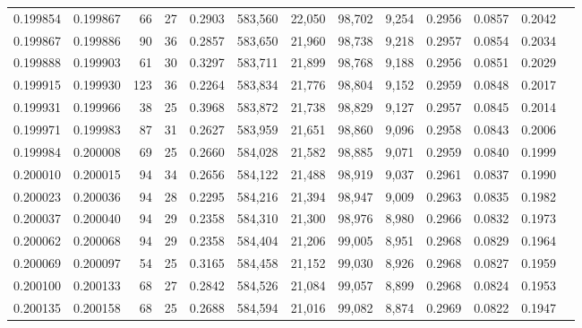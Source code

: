 \begin{tabular}{rrrrrrrrrrrrr}
0.199854 & 0.199867 &    66 &  27 &                                     0.2903 & 583,560 &  22,050 &  98,702 &   9,254 & 0.2956 & 0.0857 & 0.2042 \\
0.199867 & 0.199886 &    90 &  36 &                                     0.2857 & 583,650 &  21,960 &  98,738 &   9,218 & 0.2957 & 0.0854 & 0.2034 \\
0.199888 & 0.199903 &    61 &  30 &                                     0.3297 & 583,711 &  21,899 &  98,768 &   9,188 & 0.2956 & 0.0851 & 0.2029 \\
0.199915 & 0.199930 &   123 &  36 &                                     0.2264 & 583,834 &  21,776 &  98,804 &   9,152 & 0.2959 & 0.0848 & 0.2017 \\
0.199931 & 0.199966 &    38 &  25 &                                     0.3968 & 583,872 &  21,738 &  98,829 &   9,127 & 0.2957 & 0.0845 & 0.2014 \\
0.199971 & 0.199983 &    87 &  31 &                                     0.2627 & 583,959 &  21,651 &  98,860 &   9,096 & 0.2958 & 0.0843 & 0.2006 \\
0.199984 & 0.200008 &    69 &  25 &                                     0.2660 & 584,028 &  21,582 &  98,885 &   9,071 & 0.2959 & 0.0840 & 0.1999 \\
0.200010 & 0.200015 &    94 &  34 &                                     0.2656 & 584,122 &  21,488 &  98,919 &   9,037 & 0.2961 & 0.0837 & 0.1990 \\
0.200023 & 0.200036 &    94 &  28 &                                     0.2295 & 584,216 &  21,394 &  98,947 &   9,009 & 0.2963 & 0.0835 & 0.1982 \\
0.200037 & 0.200040 &    94 &  29 &                                     0.2358 & 584,310 &  21,300 &  98,976 &   8,980 & 0.2966 & 0.0832 & 0.1973 \\
0.200062 & 0.200068 &    94 &  29 &                                     0.2358 & 584,404 &  21,206 &  99,005 &   8,951 & 0.2968 & 0.0829 & 0.1964 \\
0.200069 & 0.200097 &    54 &  25 &                                     0.3165 & 584,458 &  21,152 &  99,030 &   8,926 & 0.2968 & 0.0827 & 0.1959 \\
0.200100 & 0.200133 &    68 &  27 &                                     0.2842 & 584,526 &  21,084 &  99,057 &   8,899 & 0.2968 & 0.0824 & 0.1953 \\
0.200135 & 0.200158 &    68 &  25 &                                     0.2688 & 584,594 &  21,016 &  99,082 &   8,874 & 0.2969 & 0.0822 & 0.1947 \\

\end{tabular}
